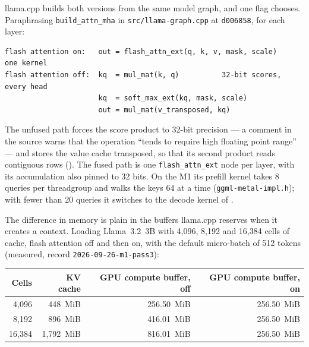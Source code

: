 llama.cpp builds both versions from the same model graph, and one flag chooses.
Paraphrasing \texttt{build\_attn\_mha} in \texttt{src/llama-graph.cpp} at
\texttt{d006858}, for each layer:

\begin{verbatim}
flash attention on:   out = flash_attn_ext(q, k, v, mask, scale)     one kernel
flash attention off:  kq  = mul_mat(k, q)          32-bit scores, every head
                      kq  = soft_max_ext(kq, mask, scale)
                      out = mul_mat(v_transposed, kq)
\end{verbatim}

\noindent The unfused path forces the score product to 32-bit precision --- a
comment in the source warns that the operation ``tends to require high floating
point range'' --- and stores the value cache transposed, so that its second
product reads contiguous rows (). The fused path is one
\texttt{flash\_attn\_ext} node per layer, with its accumulation also pinned to
32 bits. On the M1 its prefill kernel takes 8 queries per threadgroup and walks
the keys 64 at a time (\texttt{ggml-metal-impl.h}); with fewer than 20 queries
it switches to the decode kernel of .

The difference in memory is plain in the buffers llama.cpp reserves when it
creates a context. Loading Llama~3.2~3B with 4,096, 8,192 and 16,384 cells of
cache, flash attention off and then on, with the default micro-batch of 512
tokens (measured, record \texttt{2026-09-26-m1-pass3}):

\begin{center}\small
\begin{tabular}{@{}rrrr@{}}
\toprule
Cells & KV cache & GPU compute buffer, off & GPU compute buffer, on \\
\midrule
4,096 & 448~MiB & 256.50~MiB & 256.50~MiB \\
8,192 & 896~MiB & 416.01~MiB & 256.50~MiB \\
16,384 & 1,792~MiB & 816.01~MiB & 256.50~MiB \\
\bottomrule
\end{tabular}
\end{center}


